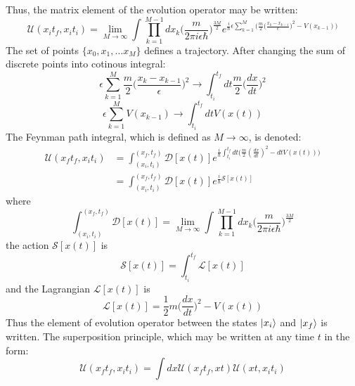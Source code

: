 \documentclass[12pt]{article}
\begin{document}
Thus, the matrix element of the evolution operator may be written:
\begin{equation*}
    \mathcal{U}(x_it_f,x_it_i)=\lim_{M\rightarrow\infty}\int\prod_{k=1}^{M-1}dx_k
    \Big(\frac{m}{2\pi i\epsilon\hbar}\Big)^\frac{3M}{2}e^{\frac{i}{\hbar}\epsilon
    \sum_{k=1}^M\Big(\frac{m}{2}\big(\frac{x_k-x_{k-1}}{\epsilon}\big)^2-V(x_{k-1})\Big)}
\end{equation*}
The set of points $\{x_0,x_1,\dots x_M\}$ defines a trajectory. After changing the 
sum of discrete points into cotinous integral:
\begin{equation*}
    \epsilon\sum_{k=1}^M\frac{m}{2}\big(\frac{x_k-x_{k-1}}{\epsilon}\big)^2
    \rightarrow\int_{t_i}^{t_f} dt\frac{m}{2}\Big(\frac{dx}{dt}\Big)^2
\end{equation*}
\begin{equation*}
    \epsilon\sum_{k=1}^MV(x_{k-1})\rightarrow\int_{t_i}^{t_f} dtV(x(t))
\end{equation*}
The Feynman path integral, which is defined as $M\rightarrow\infty$, is denoted:
\begin{equation*}
    \begin{split}
        \mathcal{U}(x_ft_f,x_it_i)&=\int_{(x_i,t_i)}^{(x_f,t_f)}\mathcal{D}[x(t)]
        e^{\frac{i}{\hbar}\int_{t_i}^{t_f} dt\big(\frac{m}{2}(\frac{dx}{dt})^2
        -dtV(x(t))\big)}\\
        &=\int_{(x_i,t_i)}^{(x_f,t_f)}\mathcal{D}[x(t)]
        e^{\frac{i}{\hbar}\mathcal{S}[x(t)]}
    \end{split}
\end{equation*}
where 
\begin{equation*}
    \int_{(x_i,t_i)}^{(x_f,t_f)}\mathcal{D}[x(t)]=\lim_{M\rightarrow\infty}
    \int\prod_{k=1}^{M-1}dx_k\Big(\frac{m}{2\pi i\epsilon\hbar}\Big)^\frac{3M}{2}
\end{equation*}
the action $\mathcal{S}[x(t)]$ is 
\begin{equation*}
    \mathcal{S}[x(t)]=\int_{t_i}^{t_f}\mathcal{L}[x(t)]
\end{equation*}
and the Lagrangian $\mathcal{L}[x(t)]$ is 
\begin{equation*}
    \mathcal{L}[x(t)]=\frac{1}{2}m\Big(\frac{dx}{dt}\Big)^2-V(x(t))
\end{equation*}
Thus the element of evolution operator between the states $\ket{x_i}$ and $\ket{x_f}$ 
is written. The superposition principle, which may be written at any time $t$ in the 
form:
\begin{equation*}
    \mathcal{U}(x_ft_f,x_it_i)=\int dx\mathcal{U}(x_ft_f,xt)
    \mathcal{U}(xt,x_it_i)
\end{equation*}
\end{document}
